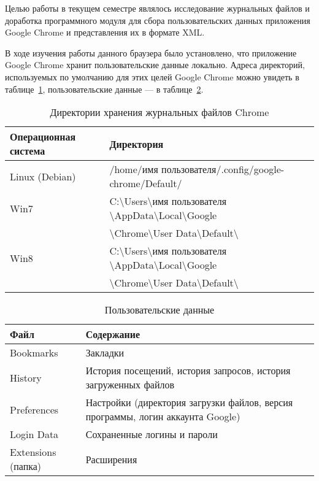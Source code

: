 Целью работы в текущем семестре являлось исследование журнальных файлов и доработка программного модуля для сбора пользовательских данных приложения Google Chrome и представления их в формате XML.

В ходе изучения работы данного браузера было установлено, что приложение Google Chrome хранит пользовательские данные локально. Адреса директорий, используемых по умолчанию для этих целей Google Chrome можно увидеть в таблице~\ref{tab:tab_1}, пользовательские данные --- в таблице~\ref{tab:tab_2}.

\begin{table}[ht]
\caption{Директории хранения журнальных файлов Chrome}
\label{tab:tab_1}
\begin{center}
\begin{tabularx}{\linewidth}{|l|X|}
\hline
Операционная система & Директория \\
\hline
Linux (Debian) & /home/имя пользователя/.config/google-chrome/Default/ \\
\hline
Win7 & C:\textbackslash Users\textbackslash имя пользователя \textbackslash AppData\textbackslash Local\textbackslash Google \\
 & \textbackslash Chrome\textbackslash User Data\textbackslash Default\textbackslash \\
\hline
Win8 & C:\textbackslash Users\textbackslash имя пользователя \textbackslash AppData\textbackslash Local\textbackslash Google \\
 & \textbackslash Chrome\textbackslash User Data\textbackslash Default\textbackslash \\
\hline
\end{tabularx}
\end{center}
\end{table}

\begin{table}[ht]
\caption{Пользовательские данные}
\label{tab:tab_2}
\begin{center}
\begin{tabularx}{\linewidth}{|l|X|}
\hline
Файл & Содержание \\
\hline
Bookmarks & Закладки \\
\hline
History & История посещений, история запросов, история загруженных файлов \\
\hline
Preferences & Настройки (директория загрузки файлов, версия программы, логин аккаунта Google) \\
\hline
Login Data & Сохраненные логины и пароли \\
\hline
Extensions (папка) & Расширения \\
\hline
\end{tabularx}
\end{center}
\end{table}

